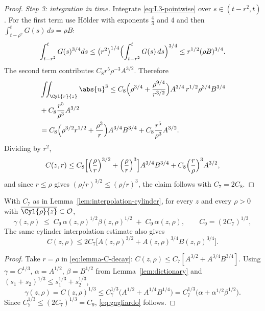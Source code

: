 \documentclass[11pt,reqno]{amsart}
\begin{document}
\begin{proof}
\emph{Step 3: integration in time.} Integrate \eqref{eq:L3-pointwise} over
$s\in(t-r^{2},t)$. For the first term use H\"older with exponents
$\tfrac43$ and $4$ and then $\int_{t-\rho^{2}}^{t}G(s)\,ds=\rho B$:
\[
  \int_{t-r^{2}}^{t}G(s)^{3/4}ds
  \le\bigl(r^{2}\bigr)^{1/4}\Bigl(\int_{t-r^{2}}^{t}G(s)\,ds\Bigr)^{3/4}
  \le r^{1/2}(\rho B)^{3/4} .
\]
The second term contributes $C_{8}r^{5}\rho^{-3}A^{3/2}$. Therefore
\[\begin{aligned}
  &\iint_{\Cyl{r}{z}}\abs{u}^{3}
  \le C_{8}\Bigl(\rho^{3/4}+\frac{\rho^{9/4}}{r^{3/2}}\Bigr)
       A^{3/4}\,r^{1/2}\rho^{3/4}B^{3/4}
  \\ &+C_{8}\frac{r^{5}}{\rho^{3}}A^{3/2}
  \\ &= C_{8}\Bigl(\rho^{3/2}r^{1/2}+\frac{\rho^{3}}{r}\Bigr)A^{3/4}B^{3/4}
    +C_{8}\frac{r^{5}}{\rho^{3}}A^{3/2}.
\end{aligned}\]
Dividing by $r^{2}$,
\[
  C(z,r)\le C_{8}\Bigl[\Bigl(\frac\rho r\Bigr)^{3/2}
     +\Bigl(\frac\rho r\Bigr)^{3}\Bigr]A^{3/4}B^{3/4}
    +C_{8}\Bigl(\frac r\rho\Bigr)^{3}A^{3/2},
\]
and since $r\le\rho$ gives $(\rho/r)^{3/2}\le(\rho/r)^{3}$, the claim follows
with $C_{7}=2C_{8}$.
\end{proof}

\begin{corollary}\label{cor:gagliardo}
With $C_{7}$ as in Lemma~\ref{lem:interpolation-cylinder}, for every $z$ and
every $\rho>0$ with $\overline{\Cyl{\rho}{z}}\subset\mathcal{O}$,
\begin{equation}\label{eq:gagliardo}
  \gamma(z,\rho)\;\le\;C_{9}\,\alpha(z,\rho)^{1/2}\beta(z,\rho)^{1/2}
    \;+\;C_{9}\,\alpha(z,\rho),
  \qquad C_{9}=(2C_{7})^{1/3},
\end{equation}
The same cylinder interpolation estimate also gives
\[
C(z,\rho)\le 2C_{7}\bigl[A(z,\rho)^{3/2}+A(z,\rho)^{3/4}B(z,\rho)^{3/4}\bigr]
.
\]
\end{corollary}

\begin{proof}
Take $r=\rho$ in \eqref{eq:lemma-C-decay}:
$C(z,\rho)\le C_{7}[A^{3/2}+A^{3/4}B^{3/4}]$. Using
$\gamma=C^{1/3}$, $\alpha=A^{1/2}$, $\beta=B^{1/2}$ from
Lemma~\ref{lem:dictionary} and
$(s_{1}+s_{2})^{1/3}\le s_{1}^{1/3}+s_{2}^{1/3}$,
\[
  \gamma(z,\rho)=C(z,\rho)^{1/3}
  \le C_{7}^{1/3}\bigl(A^{1/2}+A^{1/4}B^{1/4}\bigr)
  = C_{7}^{1/3}\bigl(\alpha+\alpha^{1/2}\beta^{1/2}\bigr).
\]
Since $C_{7}^{1/3}\le(2C_{7})^{1/3}=C_{9}$, \eqref{eq:gagliardo} follows.
\end{proof}
\end{document}

